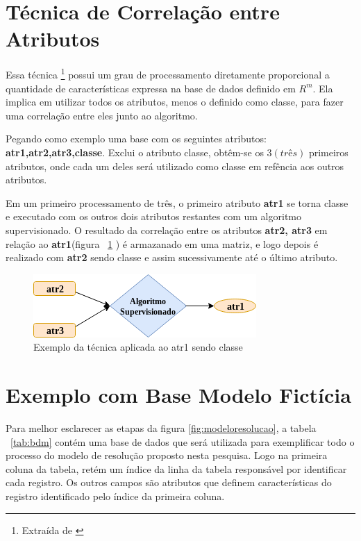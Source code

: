 \section{Técnica de Correlação entre Atributos }\label{cap:ferramentas:sec:tecnica}

Essa técnica \footnote{Extraída  de \cite{Lopes}} possui um grau de processamento diretamente proporcional a quantidade de características expressa na base de dados definido em ${R^m}$. Ela implica em utilizar todos os atributos, menos o definido como classe, para fazer uma correlação entre eles junto ao algoritmo.


Pegando como exemplo uma base com os seguintes atributos: \textbf{atr1,atr2,atr3,classe}. Exclui o atributo classe, obtêm-se os ${3 (três)}$ primeiros atributos, onde cada um deles será utilizado como classe em refência aos outros atributos. 

Em um primeiro processamento de três, o primeiro atributo \textbf{atr1} se torna classe e executado com os outros dois atributos restantes com um algoritmo supervisionado. O resultado da correlação entre os atributos \textbf{atr2, atr3} em relação ao \textbf{atr1}(figura ~\ref{fig:tecnicamodelo} ) é armazanado em uma matriz, e logo depois é realizado com \textbf{atr2} sendo classe e assim sucessivamente até o último atributo.


\begin{figure}[h!]
        \centering
        \includegraphics[scale=0.7]{figs/tecnicamodelo.png}
        \caption{Exemplo da técnica aplicada ao atr1 sendo classe } \label{fig:tecnicamodelo}
\end{figure}


\section{Exemplo com Base Modelo Fictícia} \label{cap:ferramentas:sec:exebasemodfic}

Para melhor esclarecer as etapas da figura \ref{fig:modeloresolucao}, a tabela ~\ref{tab:bdm} contém uma base de dados que será utilizada para exemplificar todo o processo do modelo de resolução proposto nesta pesquisa. Logo na primeira coluna da tabela, retém um índice da linha da tabela responsável por identificar cada registro. Os outros campos são atributos que definem características do registro identificado pelo índice da primeira coluna.

